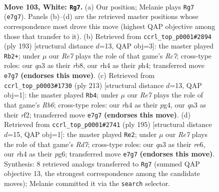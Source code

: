 \documentclass[11pt]{article}
\begin{document}
\clearpage

\begin{figure}[p]\centering
\begin{subfigure}{0.46\textwidth}\centering
\resizebox{\linewidth}{!}{%
\newchessgame
\chessboard[
  setfen={1k6/4R3/8/8/p6r/q7/5K2/8 w - - 0 103},
  showmover=false,
  pgfstyle=straightmove, color=movearrow, markmove={e7-g7}
]}
\caption{}
\end{subfigure}\hfill
\begin{subfigure}{0.46\textwidth}\centering
\resizebox{\linewidth}{!}{%
\newchessgame
\chessboard[
  setfen={1R6/1P4k1/8/1K6/7P/8/2r5/8 b - - 6 97},
  showmover=false,
  pgfstyle=straightmove, color=movearrow, markmove={c2-b2}
]}
\caption{}
\end{subfigure}
\\[4pt]
\begin{subfigure}{0.46\textwidth}\centering
\resizebox{\linewidth}{!}{%
\newchessgame
\chessboard[
  setfen={8/6k1/8/8/6PK/1r6/5RP1/8 b - - 16 107},
  showmover=false,
  pgfstyle=straightmove, color=movearrow, markmove={b3-b4}
]}
\caption{}
\end{subfigure}\hfill
\begin{subfigure}{0.46\textwidth}\centering
\resizebox{\linewidth}{!}{%
\newchessgame
\chessboard[
  setfen={8/6k1/4R1P1/2K5/4P3/8/3r4/8 b - - 72 98},
  showmover=false,
  pgfstyle=straightmove, color=movearrow, markmove={d2-e2}
]}
\caption{}
\end{subfigure}
\caption{\textbf{Move 103, White: \texttt{Rg7}.} (a) Our position; Melanie plays \texttt{Rg7} (\texttt{e7g7}). Panels (b)--(d) are the retrieved master positions whose correspondence most drove this move (highest QAP objective among those that transfer to it). (b) Retrieved from \texttt{ccrl\_top\_p0001\#2894} (ply 193) [structural distance $d$=13, QAP obj=3]: the master played \texttt{Rb2+}; under $\mu$ our \emph{Re7} plays the role of that game's \emph{Rc7}; cross-type roles: our \emph{q}a3 as their \emph{r}b8, our \emph{r}h4 as their \emph{p}h4; transferred move \texttt{e7g7} \textbf{(endorses this move)}. (c) Retrieved from \texttt{ccrl\_top\_p0003\#1730} (ply 213) [structural distance $d$=13, QAP obj=1]: the master played \texttt{Rb4}; under $\mu$ our \emph{Re7} plays the role of that game's \emph{Rb6}; cross-type roles: our \emph{r}h4 as their \emph{p}g4, our \emph{q}a3 as their \emph{r}f2; transferred move \texttt{e7g7} \textbf{(endorses this move)}. (d) Retrieved from \texttt{ccrl\_top\_p0001\#2741} (ply 195) [structural distance $d$=15, QAP obj=1]: the master played \texttt{Re2}; under $\mu$ our \emph{Re7} plays the role of that game's \emph{Rd7}; cross-type roles: our \emph{q}a3 as their \emph{r}e6, our \emph{r}h4 as their \emph{p}g6; transferred move \texttt{e7g7} \textbf{(endorses this move)}. Synthesis: 8 retrieved analogs transferred to \texttt{Rg7} (summed QAP objective 13, the strongest correspondence among the candidate moves); Melanie committed it via the \texttt{search} selector.}
\label{fig:thought-m204}
\end{figure}
\end{document}
